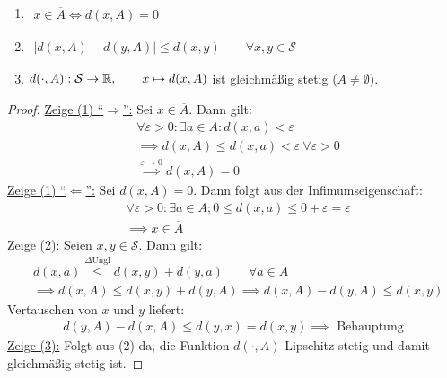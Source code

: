 \begin{lemma}\label{lemma2.3}\ %
\begin{enumerate}[label={(\arabic*)}]
\item $\begin{aligned}
x\in\overline{A}\Longleftrightarrow d(x,A)=0
\end{aligned}$
\item $\begin{aligned}
\big| d(x,A)-d(y,A)\big|\leq d(x,y)\qquad\forall x,y\in\mathcal{S}
\end{aligned}$
\item $\begin{aligned}
d(\cdot, A):\mathcal{S}\to\mathbb{R},\qquad x\mapsto d(x,A)
\end{aligned}$ ist gleichmäßig stetig ($A\neq\emptyset$).
\end{enumerate}
\end{lemma}

\begin{proof}
\underline{Zeige (1) ``$\Rightarrow$'':} Sei $x\in\overline{A}$. Dann gilt:
\begin{align*}
&\forall\varepsilon>0:\exists a\in A: d(x,a)<\varepsilon\\
&\implies d(x,A)\leq d(x,a)<\varepsilon~\forall\varepsilon>0\\
&\stackrel{\varepsilon\to0}{\implies}
d(x,A)=0
\end{align*}
\underline{Zeige (1) ``$\Leftarrow$'':}
Sei $d(x,A)=0$. Dann folgt aus der Infimumseigenschaft:
\begin{align*}
&\forall\varepsilon>0:\exists a\in A;0\leq d(x,a)\leq0+\varepsilon=\varepsilon\\
&\implies x\in\overline{A}
\end{align*}
\underline{Zeige (2):} Seien $x,y\in\mathcal{S}$. Dann gilt:
\begin{align*}
&d(x,a)
\stackrel{\Delta\text{Ungl}}{\leq}
d(x,y)+d(y,a)\qquad\forall a\in A\\
&\implies
d(x,A)\leq d(x,y)+d(y,A)\implies d(x,A)-d(y,A)\leq d(x,y)
\end{align*}
Vertauschen von $x$ und $y$ liefert:
\begin{align*}
d(y,A)-d(x,A)\leq d(y,x)=d(x,y)\implies\text{ Behauptung}
\end{align*}
\underline{Zeige (3):} Folgt aus (2) da, die Funktion $d(\cdot,A)$ Lipschitz-stetig und damit gleichmäßig stetig ist.
\end{proof}


